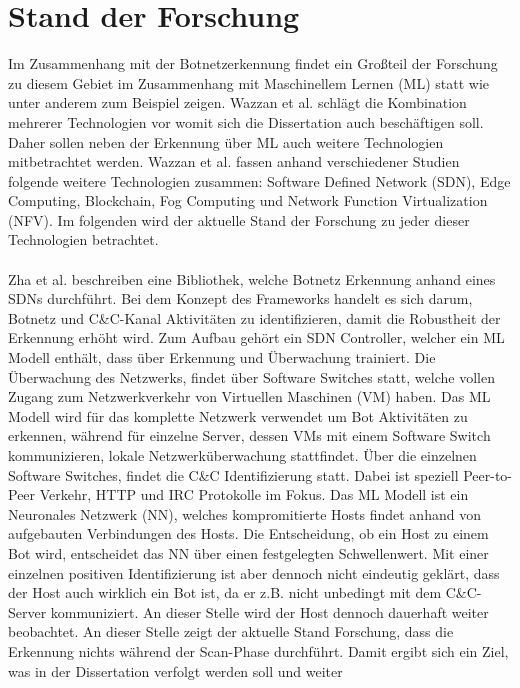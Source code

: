 \section{Stand der Forschung}
\label{sec:research}

Im Zusammenhang mit der Botnetzerkennung findet ein Großteil der Forschung zu diesem Gebiet im Zusammenhang mit Maschinellem Lernen (ML) statt wie
unter anderem zum Beispiel \cite{SAlrayes2022ModelingOB,DBLP:journals/comcom/Alani22,Habtamu2022ASR} zeigen. Wazzan et al. \cite{Wazzan2021InternetOT} schlägt die Kombination 
mehrerer Technologien vor womit sich die Dissertation auch beschäftigen soll. Daher sollen neben der Erkennung über ML auch weitere Technologien mitbetrachtet werden. Wazzan et al. 
fassen anhand verschiedener Studien folgende weitere Technologien zusammen: Software Defined Network (SDN), Edge Computing, Blockchain, Fog Computing und Network Function Virtualization (NFV). 
Im folgenden wird der aktuelle Stand der Forschung zu jeder dieser Technologien betrachtet. \\ \\ Zha et al. \cite{DBLP:conf/cns/Zha0GMC19} beschreiben 
eine Bibliothek, welche Botnetz Erkennung anhand eines SDNs durchführt. Bei dem Konzept des Frameworks handelt es sich darum, Botnetz und C\&C-Kanal Aktivitäten 
zu identifizieren, damit die Robustheit der Erkennung erhöht wird. Zum Aufbau gehört ein SDN Controller, welcher ein ML Modell enthält, dass über Erkennung und 
Überwachung trainiert. Die Überwachung des Netzwerks, findet über Software Switches statt, welche vollen Zugang zum Netzwerkverkehr von Virtuellen Maschinen (VM) haben.
Das ML Modell wird für das komplette Netzwerk verwendet um Bot Aktivitäten zu erkennen, während für einzelne Server, dessen VMs mit einem Software Switch kommunizieren, 
lokale Netzwerküberwachung stattfindet. Über die einzelnen Software Switches, findet die C\&C Identifizierung statt. Dabei ist speziell Peer-to-Peer Verkehr, HTTP und IRC
Protokolle im Fokus. Das ML Modell ist ein Neuronales Netzwerk (NN), welches kompromitierte Hosts findet anhand von aufgebauten Verbindungen des Hosts. Die Entscheidung, ob ein 
Host zu einem Bot wird, entscheidet das NN über einen festgelegten Schwellenwert. Mit einer einzelnen positiven Identifizierung ist aber dennoch nicht eindeutig geklärt, dass der
Host auch wirklich ein Bot ist, da er z.B. nicht unbedingt mit dem C\&C-Server kommuniziert. An dieser Stelle wird der Host dennoch dauerhaft weiter beobachtet. An dieser Stelle
zeigt der aktuelle Stand Forschung, dass die Erkennung nichts während der Scan-Phase durchführt. Damit ergibt sich ein Ziel, was in der Dissertation verfolgt werden soll und weiter
